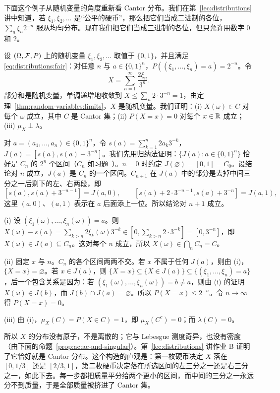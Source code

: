 下面这个例子从随机变量的角度重新看 Cantor 分布。我们在第~\ref{lec:distributions} 讲中知道，若 $\xi_1,\xi_2,\dots$ 是“公平的硬币”，那么把它们当成二进制的各位，$\sum_n\xi_n2^{-n}$ 服从均匀分布。现在我们把它们当成三进制的各位，但只允许用数字 $0$ 和 $2$。

\begin{example}[用硬币构造的奇异分布]\label{ex:ac:cantor-coins}
设 $(\Omega,\mathcal{F},P)$ 上的随机变量 $\xi_1,\xi_2,\dots$ 取值于 $\{0,1\}$，并且满足 \eqref{eq:distributions:fair}：对任意 $n$ 与 $a\in\{0,1\}^n$，$P((\xi_1,\dots,\xi_n)=a)=2^{-n}$。令
\[
X=\sum_{n=1}^\infty\frac{2\xi_n}{3^n}.
\]
部分和是随机变量，单调递增地收敛到 $X\leqslant\sum_n2\cdot3^{-n}=1$，由定理~\ref{thm:random-variables:limits}，$X$ 是随机变量。我们证明：(i) $X(\omega)\in C$ 对每个 $\omega$ 成立，其中 $C$ 是 Cantor 集；(ii) $P(X=x)=0$ 对每个 $x\in\mathbb{R}$ 成立；(iii) $\mu_X\perp\lambda$。

对 $a=(a_1,\dots,a_n)\in\{0,1\}^n$，令 $s(a)=\sum_{k=1}^n2a_k3^{-k}$，$J(a)=[s(a),s(a)+3^{-n}]$。我们先用归纳法证明：$\{J(a):a\in\{0,1\}^n\}$ 恰好是 $C_n$ 的 $2^n$ 个区间（$C_n$ 如习题~）。$n=0$ 时约定 $J(\varnothing)=[0,1]=C_0$。设结论对 $n$ 成立，$J(a)$ 是 $C_n$ 的一个区间。$C_{n+1}$ 在 $J(a)$ 中的部分是去掉中间三分之一后剩下的左、右两段，即
\[
[s(a),s(a)+3^{-n-1}]=J(a,0),\qquad[s(a)+2\cdot3^{-n-1},s(a)+3^{-n}]=J(a,1),
\]
这里 $(a,0)$、$(a,1)$ 表示在 $a$ 后面添上一位。所以结论对 $n+1$ 成立。

(i) 设 $(\xi_1(\omega),\dots,\xi_n(\omega))=a$。则 $X(\omega)-s(a)=\sum_{k>n}2\xi_k(\omega)3^{-k}\in[0,\sum_{k>n}2\cdot3^{-k}]=[0,3^{-n}]$，即 $X(\omega)\in J(a)\subseteq C_n$。这对每个 $n$ 成立，所以 $X(\omega)\in\bigcap_nC_n=C$。

(ii) 固定 $x$ 与 $n$。$C_n$ 的各个区间两两不交。若 $x$ 不属于任何 $J(a)$，则由 (i)，$\{X=x\}=\varnothing$。若 $x\in J(a)$，则 $\{X=x\}\subseteq\{X\in J(a)\}\subseteq\{(\xi_1,\dots,\xi_n)=a\}$，后一个包含关系是因为：若 $(\xi_1(\omega),\dots,\xi_n(\omega))=b\neq a$，则由 (i) 的证明 $X(\omega)\in J(b)$，而 $J(b)\cap J(a)=\varnothing$。所以 $P(X=x)\leqslant2^{-n}$。令 $n\to\infty$ 得 $P(X=x)=0$。

(iii) 由 (i)，$\mu_X(C)=P(X\in C)=1$，即 $\mu_X(C^c)=0$；而 $\lambda(C)=0$。

所以 $X$ 的分布没有原子，不是离散的；它与 Lebesgue 测度奇异，也没有密度（由下面的命题~\ref{prop:ac:ac-and-singular}）。第~\ref{lec:distributions} 讲作业 B 证明了它恰好就是 Cantor 分布。这个构造的直观是：第一枚硬币决定 $X$ 落在 $[0,1/3]$ 还是 $[2/3,1]$，第二枚硬币决定落在所选区间的左三分之一还是右三分之一，如此下去。每一步都把质量平分给两个更小的区间，而中间的三分之一永远分不到质量，于是全部质量被挤进了 Cantor 集。
\end{example}

